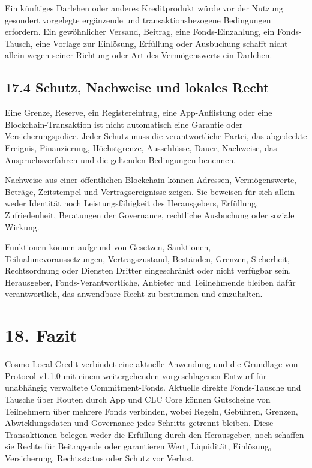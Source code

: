 \documentclass[11pt]{article}
\begin{document}
Ein künftiges Darlehen oder anderes Kreditprodukt würde vor der Nutzung gesondert vorgelegte ergänzende und transaktionsbezogene Bedingungen erfordern. Ein gewöhnlicher Versand, Beitrag, eine Fonds-Einzahlung, ein Fonds-Tausch, eine Vorlage zur Einlösung, Erfüllung oder Ausbuchung schafft nicht allein wegen seiner Richtung oder Art des Vermögenswerts ein Darlehen.

\subsection*{17.4 Schutz, Nachweise und lokales Recht}

Eine Grenze, Reserve, ein Registereintrag, eine App-Auflistung oder eine Blockchain-Transaktion ist nicht automatisch eine Garantie oder Versicherungspolice. Jeder Schutz muss die verantwortliche Partei, das abgedeckte Ereignis, Finanzierung, Höchstgrenze, Ausschlüsse, Dauer, Nachweise, das Anspruchsverfahren und die geltenden Bedingungen benennen.

Nachweise aus einer öffentlichen Blockchain können Adressen, Vermögenswerte, Beträge, Zeitstempel und Vertragsereignisse zeigen. Sie beweisen für sich allein weder Identität noch Leistungsfähigkeit des Herausgebers, Erfüllung, Zufriedenheit, Beratungen der Governance, rechtliche Ausbuchung oder soziale Wirkung.

Funktionen können aufgrund von Gesetzen, Sanktionen, Teilnahmevoraussetzungen, Vertragszustand, Beständen, Grenzen, Sicherheit, Rechtsordnung oder Diensten Dritter eingeschränkt oder nicht verfügbar sein. Herausgeber, Fonds-Verantwortliche, Anbieter und Teilnehmende bleiben dafür verantwortlich, das anwendbare Recht zu bestimmen und einzuhalten.


\section*{18. Fazit}

Cosmo-Local Credit verbindet eine aktuelle Anwendung und die Grundlage von Protocol v1.1.0 mit einem weitergehenden vorgeschlagenen Entwurf für unabhängig verwaltete Commitment-Fonds. Aktuelle direkte Fonds-Tausche und Tausche über Routen durch App und CLC Core können Gutscheine von Teilnehmern über mehrere Fonds verbinden, wobei Regeln, Gebühren, Grenzen, Abwicklungsdaten und Governance jedes Schritts getrennt bleiben. Diese Transaktionen belegen weder die Erfüllung durch den Herausgeber, noch schaffen sie Rechte für Beitragende oder garantieren Wert, Liquidität, Einlösung, Versicherung, Rechtsstatus oder Schutz vor Verlust.
\end{document}
